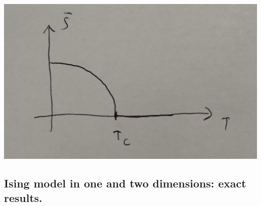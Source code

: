 \documentclass[10pt,a4paper]{book}
\begin{document}
\includegraphics[scale=0.16]{graphs/ising2}

\subsection{Ising model in one and two dimensions: exact results.}
\end{document}
